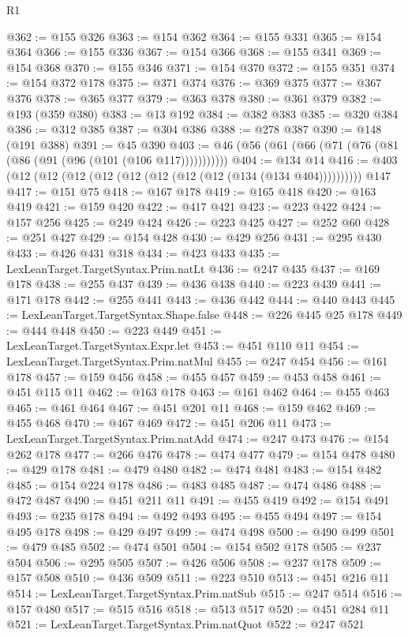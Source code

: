 \begin{lexlean}{R1}
\begin{coremodule}
@362 := @155 @326
@363 := @154 @362
@364 := @155 @331
@365 := @154 @364
@366 := @155 @336
@367 := @154 @366
@368 := @155 @341
@369 := @154 @368
@370 := @155 @346
@371 := @154 @370
@372 := @155 @351
@374 := @154 @372 @178
@375 := @371 @374
@376 := @369 @375
@377 := @367 @376
@378 := @365 @377
@379 := @363 @378
@380 := @361 @379
@382 := @193 (@359 @380)
@383 := @13 @192
@384 := @382 @383
@385 := @320 @384
@386 := @312 @385
@387 := @304 @386
@388 := @278 @387
@390 := @148 (@191 @388)
@391 := @45 @390
@403 := @46 (@56 (@61 (@66 (@71 (@76 (@81 (@86 (@91 (@96 (@101 (@106 @117)))))))))))
@404 := @134 @14
@416 := @403 (@12 (@12 (@12 (@12 (@12 (@12 (@12 (@12 (@134 (@134 @404)))))))))) @147
@417 := @151 @75
@418 := @167 @178
@419 := @165 @418
@420 := @163 @419
@421 := @159 @420
@422 := @417 @421
@423 := @223 @422
@424 := @157 @256
@425 := @249 @424
@426 := @223 @425
@427 := @252 @60
@428 := @251 @427
@429 := @154 @428
@430 := @429 @256
@431 := @295 @430
@433 := @426 @431 @318
@434 := @423 @433
@435 := LexLeanTarget.TargetSyntax.Prim.natLt
@436 := @247 @435
@437 := @169 @178
@438 := @255 @437
@439 := @436 @438
@440 := @223 @439
@441 := @171 @178
@442 := @255 @441
@443 := @436 @442
@444 := @440 @443
@445 := LexLeanTarget.TargetSyntax.Shape.false
@448 := @226 @445 @25 @178
@449 := @444 @448
@450 := @223 @449
@451 := LexLeanTarget.TargetSyntax.Expr.let
@453 := @451 @110 @11
@454 := LexLeanTarget.TargetSyntax.Prim.natMul
@455 := @247 @454
@456 := @161 @178
@457 := @159 @456
@458 := @455 @457
@459 := @453 @458
@461 := @451 @115 @11
@462 := @163 @178
@463 := @161 @462
@464 := @455 @463
@465 := @461 @464
@467 := @451 @201 @11
@468 := @159 @462
@469 := @455 @468
@470 := @467 @469
@472 := @451 @206 @11
@473 := LexLeanTarget.TargetSyntax.Prim.natAdd
@474 := @247 @473
@476 := @154 @262 @178
@477 := @266 @476
@478 := @474 @477
@479 := @154 @478
@480 := @429 @178
@481 := @479 @480
@482 := @474 @481
@483 := @154 @482
@485 := @154 @224 @178
@486 := @483 @485
@487 := @474 @486
@488 := @472 @487
@490 := @451 @211 @11
@491 := @455 @419
@492 := @154 @491
@493 := @235 @178
@494 := @492 @493
@495 := @455 @494
@497 := @154 @495 @178
@498 := @429 @497
@499 := @474 @498
@500 := @490 @499
@501 := @479 @485
@502 := @474 @501
@504 := @154 @502 @178
@505 := @237 @504
@506 := @295 @505
@507 := @426 @506
@508 := @237 @178
@509 := @157 @508
@510 := @436 @509
@511 := @223 @510
@513 := @451 @216 @11
@514 := LexLeanTarget.TargetSyntax.Prim.natSub
@515 := @247 @514
@516 := @157 @480
@517 := @515 @516
@518 := @513 @517
@520 := @451 @284 @11
@521 := LexLeanTarget.TargetSyntax.Prim.natQuot
@522 := @247 @521

\end{coremodule}
\end{lexlean}
